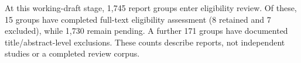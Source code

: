 At this working-draft stage, 1,745 report groups
enter eligibility review. Of these, 15 groups
have completed full-text eligibility assessment (8
retained and 7 excluded), while
1,730 remain pending. A further
171 groups have documented
title/abstract-level exclusions. These counts describe reports, not
independent studies or a completed review corpus.
